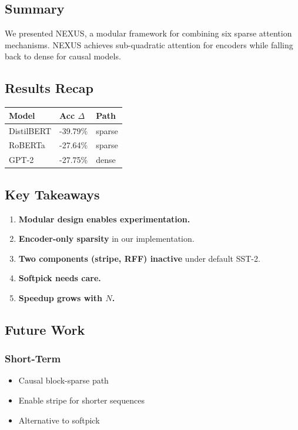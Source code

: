 \subsection{Summary}

We presented NEXUS, a modular framework for combining six sparse attention 
mechanisms. NEXUS achieves sub-quadratic attention for encoders while 
falling back to dense for causal models.

\subsection{Results Recap}

\begin{table}[H]
\centering
\small
\begin{tabular}{lll}
\toprule
\textbf{Model} & \textbf{Acc $\Delta$} & \textbf{Path} \\
\midrule
DistilBERT & -39.79\% & sparse \\
RoBERTa & -27.64\% & sparse \\
GPT-2 & -27.75\% & dense \\
\bottomrule
\end{tabular}
\end{table}

\subsection{Key Takeaways}

\begin{enumerate}
\item \textbf{Modular design enables experimentation.}
\item \textbf{Encoder-only sparsity} in our implementation.
\item \textbf{Two components (stripe, RFF) inactive} under default SST-2.
\item \textbf{Softpick needs care.}
\item \textbf{Speedup grows with $N$.}

\end{enumerate}
\subsection{Future Work}

\subsubsection{Short-Term}
\begin{itemize}
\item Causal block-sparse path
\item Enable stripe for shorter sequences
\item Alternative to softpick

\end{itemize}
